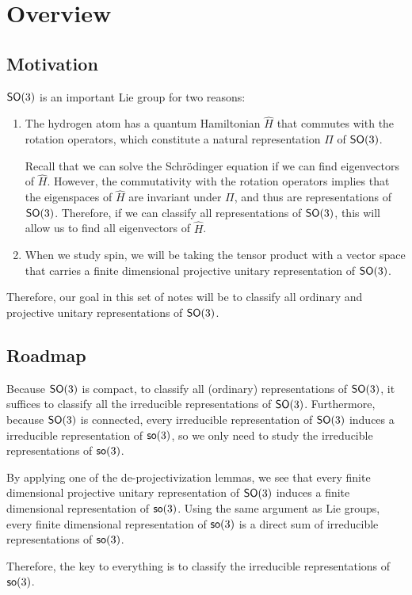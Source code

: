\section{Overview}
\subsection{Motivation}
$\operatorname{\textsf{SO}}(3)$ is an important Lie group for two reasons:
\begin{enumerate}
    \item The hydrogen atom has a quantum Hamiltonian $\hat{H}$ that commutes with the rotation operators, which constitute a natural representation $\Pi$ of $\operatorname{\textsf{SO}}(3)$.

        Recall that we can solve the Schr\"{o}dinger equation if we can find eigenvectors of $\hat{H}$. However, the commutativity with the rotation operators implies that the eigenspaces of $\hat{H}$ are invariant under $\Pi$, and thus are representations of $\operatorname{\textsf{SO}}(3)$. Therefore, if we can classify all representations of $\operatorname{\textsf{SO}}(3)$, this will allow us to find all eigenvectors of $\hat{H}$.

    \item  When we study spin, we will be taking the tensor product with a vector space that carries a finite dimensional projective unitary representation of $\operatorname{\textsf{SO}}(3)$.
\end{enumerate}
Therefore, our goal in this set of notes will be to classify all ordinary and projective unitary representations of $\operatorname{\textsf{SO}}(3)$.

\subsection{Roadmap}
Because $\operatorname{\textsf{SO}}(3)$ is compact, to classify all (ordinary) representations of $\operatorname{\textsf{SO}}(3)$, it suffices to classify all the irreducible representations of $\operatorname{\textsf{SO}}(3)$. Furthermore, because $\operatorname{\textsf{SO}}(3)$ is connected, every irreducible representation of $\operatorname{\textsf{SO}}(3)$ induces a irreducible representation of $\operatorname{\textsf{so}}(3)$, so we only need to study the irreducible representations of $\operatorname{\textsf{so}}(3)$.

By applying one of the de-projectivization lemmas, we see that every finite dimensional projective unitary representation of $\operatorname{\textsf{SO}}(3)$ induces a finite dimensional representation of $\operatorname{\textsf{so}}(3)$. Using the same argument as Lie groups, every finite dimensional representation of $\operatorname{\textsf{so}}(3)$ is a direct sum of irreducible representations of $\operatorname{\textsf{so}}(3)$.

Therefore, the key to everything is to classify the irreducible representations of $\operatorname{\textsf{so}}(3)$. 
